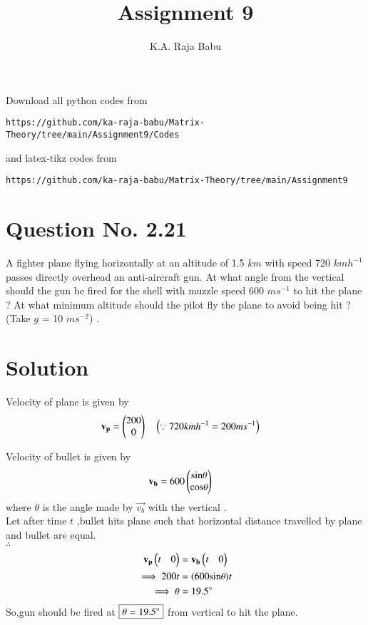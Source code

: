 \documentclass[journal,12pt,twocolumn]{IEEEtran}
\begin{document}
     \def\rightbox#1{\makebox[0in][r]{#1}}
     \def\centbox#1{\makebox[0in]{#1}}
     \def\topbox#1{\raisebox{-\baselineskip}[0in][0in]{#1}}
     \def\midbox#1{\raisebox{-0.5\baselineskip}[0in][0in]{#1}}
\vspace{3cm}
\title{Assignment 9}
\author{K.A. Raja Babu}
\maketitle
\newpage
\bigskip
\renewcommand{\thefigure}{\theenumi}
\renewcommand{\thetable}{\theenumi}
Download all python codes from 
\begin{lstlisting}
https://github.com/ka-raja-babu/Matrix-Theory/tree/main/Assignment9/Codes
\end{lstlisting}
%
and latex-tikz codes from 
%
\begin{lstlisting}
https://github.com/ka-raja-babu/Matrix-Theory/tree/main/Assignment9
\end{lstlisting}
%
\section{Question No. 2.21}
A fighter plane flying horizontally at an altitude of 1.5 $km$ with speed 720 $kmh^{-1}$ passes directly overhead an anti-aircraft gun. At what angle from the vertical should the gun be fired for the shell with muzzle speed 600 $ms^{-1}$ to hit the plane ? At what minimum altitude should the pilot fly the plane to avoid being hit ? (Take $g$ = 10 $ms^{-2}$) .
%
\section{Solution}
%

Velocity of plane is given by
\begin{align}
    \mathbf{v_p} &= \begin{pmatrix}200 \\ 0\end{pmatrix} \quad \left(\because 720 kmh^{-1}=200 ms^{-1}\right)
\end{align}

Velocity of bullet is given by
\begin{align}
    \mathbf{v_b} &= 600\begin{pmatrix}\text{sin} \theta \\ \text{cos} \theta\end{pmatrix}
\end{align}
where $\theta$ is the angle made by $\vec{v_b}$ with the vertical .
\\
Let after time $t$ ,bullet hits plane such that horizontal distance travelled by plane and bullet are equal.
\\
$\therefore$
\begin{align}
    \mathbf{v_p}\begin{pmatrix}t & 0\end{pmatrix} &= \mathbf{v_b}\begin{pmatrix}t & 0\end{pmatrix}
    \\
    \implies 200t &= (600\text{sin}\theta) t
    \\
    \implies \theta &= 19.5\degree
\end{align}
So,gun should be fired at $\boxed{\theta=19.5\degree}$ from vertical to hit the plane.
\end{document}
